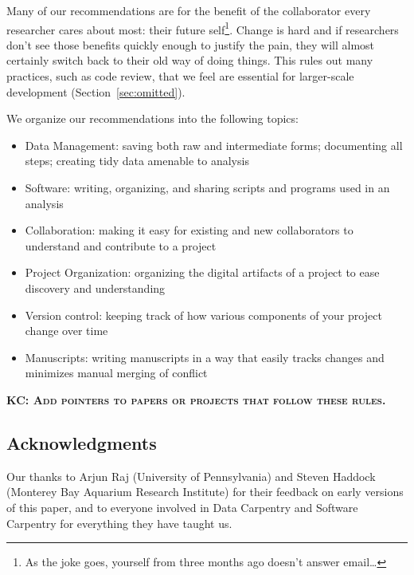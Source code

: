 \documentclass[10pt]{article}
\newcommand{\fixme}[2]{\textsc{\textbf{{#1}: {#2}}}}
\begin{document}
Many of our recommendations are for the benefit of the collaborator
every researcher cares about most: their future self\footnote{As the
joke goes, yourself from three months ago doesn't answer
email{\ldots}}. Change is hard and if researchers don't see those benefits
quickly enough to justify the pain,
they will almost certainly switch back to their old way
of doing things.  This rules out many practices, such as code review,
that we feel are essential for larger-scale development
(Section~\ref{sec:omitted}).

We organize our recommendations into the following topics:

\begin{itemize}

\item{Data Management: saving both raw and intermediate forms; documenting all steps; creating tidy data amenable to analysis}

\item{Software: writing, organizing, and sharing scripts and programs used in an analysis}

\item{Collaboration: making it easy for existing and new collaborators to understand and contribute to a project}

\item{Project Organization: organizing the digital artifacts of a project to ease discovery and understanding}

\item{Version control: keeping track of how various components of your project change over time}

\item{Manuscripts: writing manuscripts in a way that easily tracks changes and minimizes manual merging of conflict}

\end{itemize}


\fixme{KC}{Add pointers to papers or projects that follow these rules.}

\subsection*{Acknowledgments}

Our thanks to Arjun Raj (University of Pennsylvania) and Steven
Haddock (Monterey Bay Aquarium Research Institute) for their feedback
on early versions of this paper, and to everyone involved in Data
Carpentry and Software Carpentry for everything they have taught us.
\end{document}
